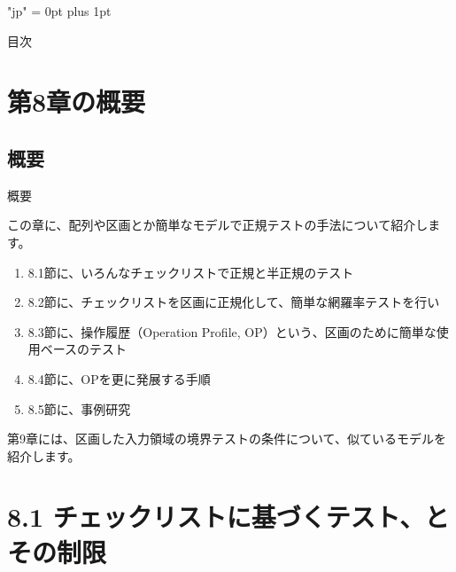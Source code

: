  

\newcommand{\toprule}{\hline}
\newcommand{\midrule}{\hline}
\newcommand{\bottomrule}{\hline}
\newcommand{\itemtitle}[1]{\item \alert{#1} \quad{} }
\newcommand{\upcite}[1]{ }

\XeTeXlinebreaklocale "jp"  
\XeTeXlinebreakskip = 0pt plus 1pt 

\frame{\titlepage} 

\begin{frame}{目次}
\tableofcontents 
\end{frame}



\section{第8章の概要}
\subsection{概要}
\begin{frame}{概要}

この章に、配列や区画とか簡単なモデルで正規テストの手法について紹介します。

\begin{enumerate}
\item 8.1節に、いろんなチェックリストで正規と半正規のテスト
\item 8.2節に、チェックリストを区画に正規化して、簡単な網羅率テストを行い
\item 8.3節に、操作履歴（Operation Profile, OP）という、区画のために簡単な使用ベースのテスト
\item 8.4節に、OPを更に発展する手順
\item 8.5節に、事例研究
\end{enumerate}

第9章には、区画した入力領域の境界テストの条件について、似ているモデルを紹介します。

\end{frame}

\section{8.1 チェックリストに基づくテスト、とその制限}
